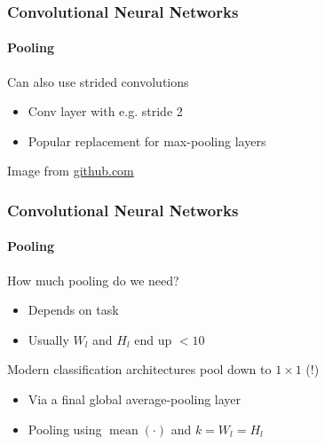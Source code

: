 \documentclass[xetex,professionalfont]{beamer}
\renewcommand\emph[1]{\textcolor{tuwcvl_cvl_blue}{#1}}
\newcommand{\eg}{\mbox{e.g.}\xspace} %
\DeclareMathOperator*{\mean}{mean}
\begin{document}
\begin{frame}
\frametitle{Convolutional Neural Networks}
\framesubtitle{Pooling}

Can also use \emph{strided convolutions}
\begin{itemize}
    \item Conv layer with \eg stride 2
    \item Popular replacement for max-pooling layers %
\end{itemize}

\begin{center}
    {\centering Image from \href{https://github.com/vdumoulin/conv_arithmetic/blob/master/gif/no_padding_strides.gif}{github.com}}
\end{center}

\end{frame}


\begin{frame}
\frametitle{Convolutional Neural Networks}
\framesubtitle{Pooling}

How much pooling do we need?
\begin{itemize}
    \item Depends on task
    \item Usually $W_l$ and $H_l$ end up $<10$ %
\end{itemize}

\bigskip

Modern classification architectures pool down to $1\times1$ (!)
\begin{itemize}
    \item Via a final \emph{global average-pooling} layer
    \item Pooling using $\mean(\cdot)$ and $k=W_l=H_l$ %
\end{itemize}

\end{frame}
\end{document}
